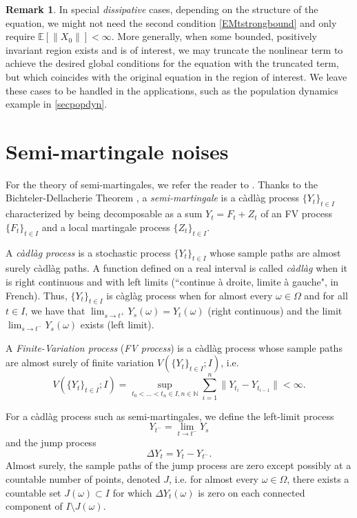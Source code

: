 \documentclass[reqno,12pt]{amsart}
\theoremstyle{plain} %
\theoremstyle{definition} %
\newtheorem{remark}{Remark}[section]
\begin{document}
\begin{remark}
    In special \emph{dissipative} cases, depending on the structure of the equation, we might not need the second condition \eqref{EMtstrongbound} and only require $\mathbb{E}[\|X_0\|] < \infty$. More generally, when some bounded, positively invariant region exists and is of interest, we may truncate the nonlinear term to achieve the desired global conditions for the equation with the truncated term, but which coincides with the original equation in the region of interest. We leave these cases to be handled in the applications, such as the population dynamics example in \cref{secpopdyn}.
\end{remark}

\section{Semi-martingale noises}

For the theory of semi-martingales, we refer the reader to \cite{Protter2005}. Thanks to the Bichteler-Dellacherie Theorem \cite[Theorem III.47]{Protter2005}, a \emph{semi-martingale} is a c\`adl\`ag process $\{Y_t\}_{t\in I}$ characterized by being decomposable as a sum $Y_t = F_t + Z_t$ of an FV process $\{F_t\}_{t\in I}$ and a local martingale process $\{Z_t\}_{t\in I}$.

A \emph{c\`adl\`ag process} is a stochastic process $\{Y_t\}_{t\in I}$ whose sample paths are almost surely c\`adl\`ag paths. A function defined on a real interval is called \emph{c\`adl\`ag} when it is right continuous and with left limits (``continue \`a droite, limite \`a gauche", in French). Thus, $\{Y_t\}_{t\in I}$ is c\`agl\`ag process when for almost every $\omega\in \Omega$ and for all $t\in I$, we have that $\lim_{s\rightarrow t^+} Y_s(\omega) = Y_t(\omega)$ (right continuous) and the limit $\lim_{s \rightarrow t^-} Y_s(\omega)$ exists (left limit).

A \emph{Finite-Variation process} (\emph{FV process}) is a c\`adl\`ag process whose sample paths are almost surely of finite variation $V(\{Y_t\}_{t\in I}; I)$, i.e.
\[ V(\{Y_t\}_{t\in I}; I) = \sup_{t_0 < \ldots < t_n \in I, n\in \mathbb{N}} \sum_{i=1}^n \|Y_{t_i} - Y_{t_{i-1}}\| < \infty.
\]

For a c\`adl\`ag process such as semi-martingales, we define the left-limit process
\begin{equation}
  Y_{t^{-}} = \lim_{t \rightarrow t^-} Y_s
\end{equation}
and the jump process
\begin{equation}
  \Delta Y_t = Y_t - Y_{t^{-}}.
\end{equation}
Almost surely, the sample paths of the jump process are zero except possibly at a countable number of points, denoted $J$, i.e. for almost every $\omega\in \Omega$, there exists a countable set $J(\omega) \subset I$ for which $\Delta Y_t(\omega)$ is zero on each connected component of $I\setminus J(\omega)$.
\end{document}
